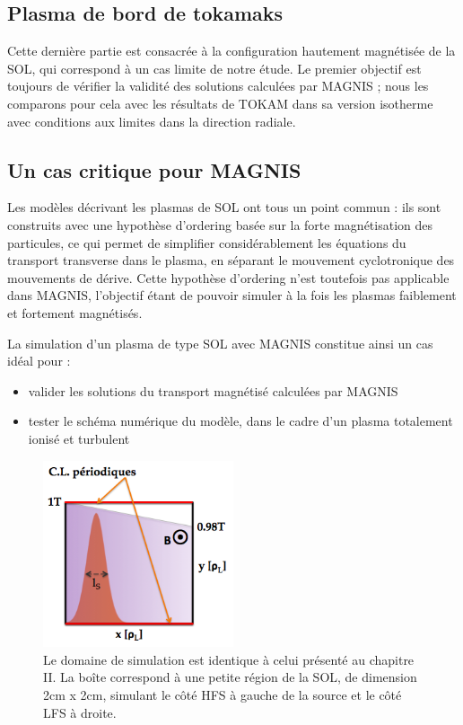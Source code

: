 \begin{refsection}
\section{Plasma de bord de tokamaks}

Cette dernière partie est consacrée à la configuration hautement magnétisée
de la SOL, qui correspond à un cas limite de notre étude. Le premier objectif
est toujours de vérifier la validité des solutions calculées par MAGNIS ; 
nous les comparons pour cela avec les résultats de
TOKAM dans sa version isotherme avec conditions aux limites dans la direction
radiale.

\subsection{Un cas critique pour MAGNIS}
Les modèles décrivant les plasmas de SOL ont tous un
point commun :
ils sont construits avec une hypothèse d'ordering basée sur la forte magnétisation des
particules, ce qui permet de simplifier considérablement les équations
du transport transverse dans le plasma, en séparant le mouvement cyclotronique
des mouvements de dérive.
Cette hypothèse d'ordering n'est
toutefois pas applicable dans MAGNIS, l'objectif étant de pouvoir simuler à la
fois les plasmas faiblement et fortement magnétisés. 

La simulation d'un plasma de type SOL avec MAGNIS constitue ainsi un cas idéal
pour :

\begin{itemize}
  \item valider les solutions du transport magnétisé calculées par MAGNIS
  \item	tester le schéma numérique du modèle, dans le cadre d'un plasma
  totalement ionisé et turbulent
 \end{itemize}
  
\begin{figure}[!htbp]
\centering
\includegraphics[width=0.5\textwidth]{figures/4-tokamSimDomain.png}
\caption{Le domaine de simulation est identique à celui présenté au
chapitre II. La boîte correspond à une petite région de la SOL, de dimension
2cm x 2cm, simulant le côté HFS à gauche de la source et le côté LFS à droite.
\label{4-tokamSimDomain}}
\end{figure}


\end{refsection}

